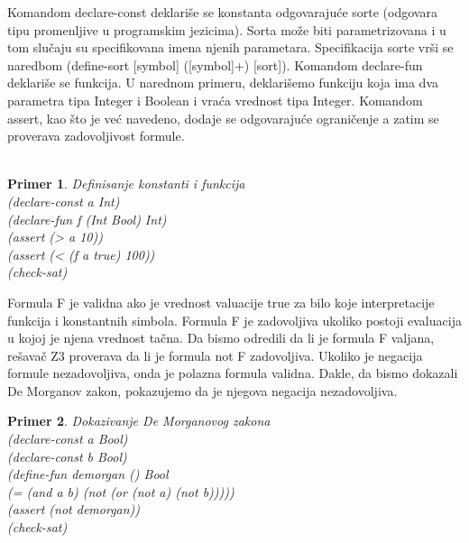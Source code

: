 \documentclass[12pt,oneside]{memoir}
\newtheorem{primer}{Primer}
\begin{document}
Komandom declare-const deklariše se konstanta odgovarajuće sorte (odgovara tipu promenljive u programskim jezicima). Sorta može biti parametrizovana i u tom slučaju su specifikovana imena njenih parametara. Specifikacija sorte vrši se naredbom (define-sort [symbol] ([symbol]+) [sort]).
Komandom declare-fun deklariše se funkcija. 
U narednom primeru, deklarišemo funkciju koja ima dva parametra tipa Integer i Boolean i vraća vrednost tipa Integer. Komandom assert, kao što je već navedeno, dodaje se odgovarajuće ograničenje a zatim se proverava zadovoljivost formule.
\\\\
\begin{primer}  Definisanje konstanti i funkcija\\
(declare-const a Int)\\
(declare-fun f (Int Bool) Int)\\
(assert (> a 10))\\
(assert (< (f a true) 100))\\
(check-sat)\\
\end{primer}

Formula F je validna ako je vrednost valuacije true za bilo koje interpretacije funkcija i konstantnih simbola. Formula F je zadovoljiva ukoliko postoji evaluacija u kojoj je njena vrednost tačna. Da bismo odredili da li je formula F valjana, rešavač Z3 proverava da li je formula not F zadovoljiva. Ukoliko je negacija formule nezadovoljiva, onda je polazna formula validna. Dakle, da bismo dokazali De Morganov zakon, pokazujemo da je njegova negacija nezadovoljiva. 
\begin{primer} Dokazivanje De Morganovog zakona
\\(declare-const a Bool)
\\(declare-const b Bool)
\\(define-fun demorgan () Bool
\\    (= (and a b) (not (or (not a) (not b)))))
\\(assert (not demorgan))
\\(check-sat) \\
\end{primer}
\end{document}
